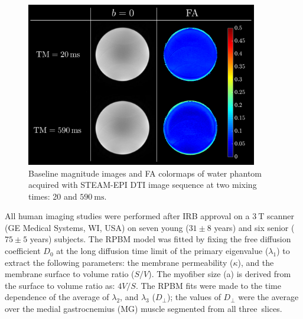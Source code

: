 \begin{figure}[!htb]
\vspace{+0.2cm}
\centering
\includegraphics[width=0.9\textwidth]{Figures/STEAM_Phantom.pdf}
\caption[Baseline magnitude images and FA colormaps of water phantom acquired with STEAM-EPI DTI image sequence at two diffusion times]{Baseline magnitude images and FA colormaps of water phantom acquired with STEAM-EPI DTI image sequence at two mixing times: 20 and $\SI{590}{\milli\second}$.}
\label{fig:STEAM phantom}
\end{figure}

All human imaging studies were performed after IRB approval on a $\SI{3}{\tesla}$ scanner (GE Medical Systems, WI, USA) on seven young ($31 \pm 8$ years) and six senior ($75 \pm 5$ years) subjects. 
The RPBM model was fitted by fixing the free diffusion coefficient $D_0$ at the long diffusion time limit of the primary eigenvalue ($\lambda_1$) to extract the following parameters: the membrane permeability ($\kappa$), and the membrane surface to volume ratio ($S/V$). 
The myofiber size (a) is derived from the surface to volume ratio as: $4V/S$. 
The RPBM fits were made to the time dependence of the average of $\lambda_2$, and $\lambda_3$ ($D_{\perp}$); the values of $D_{\perp}$ were the average over the medial gastrocnemius (MG) muscle segmented from all three~slices.
